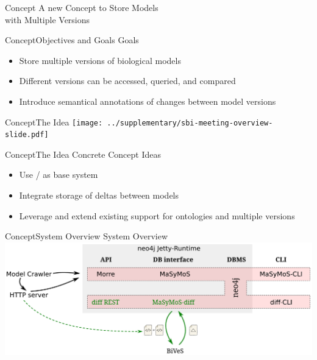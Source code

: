 \begin{frame}{Concept}{}
	\centering
	\LARGE A new Concept to Store Models\\ with Multiple Versions
\end{frame}

\begin{frame}{Concept}{Objectives and Goals}
	{\LARGE Goals}
	\\[2.5em]
	\large
	\begin{itemize}
		\item Store multiple versions of biological models
		\item Different versions can be accessed, queried, and compared
		\item Introduce semantical annotations of changes between model versions
	\end{itemize}
\end{frame}

\begin{frame}{Concept}{The Idea}
	\centering
	\texttt{[image: ../supplementary/sbi-meeting-overview-slide.pdf]}
\end{frame}

\begin{frame}{Concept}{The Idea}
	{\Large Concrete Concept Ideas}
	\\[2.5em]
	\begin{itemize}
		\item Use \neoj/\masymos \citep{Henkel2015} as base system
		\item Integrate storage of deltas between models
		\item Leverage and extend existing support for ontologies and multiple versions
	\end{itemize}
\end{frame}

\begin{frame}{Concept}{System Overview}
	{\LARGE System Overview}
	\\[2.5em]
	\centering
	\vfill
	\includegraphics[width=\linewidth,height=\textheight,keepaspectratio]{../tex/resources/system-overview-matrix.pdf}
	\vfill
\end{frame}

